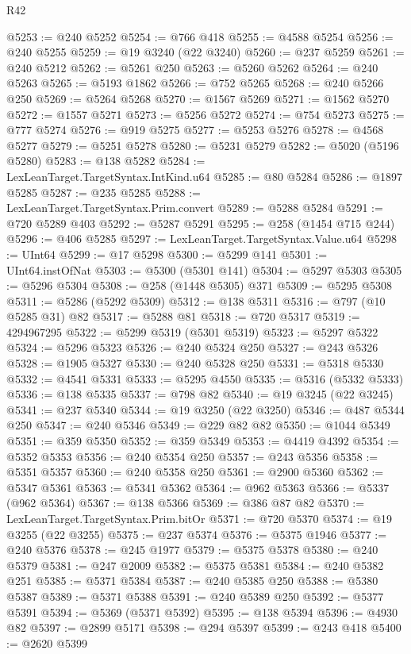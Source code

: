 \begin{lexlean}{R42}
\begin{coremodule}
{@5253 := @240 @5252
@5254 := @766 @418
@5255 := @4588 @5254
@5256 := @240 @5255
@5259 := @19 @3240 (@22 @3240)
@5260 := @237 @5259
@5261 := @240 @5212
@5262 := @5261 @250
@5263 := @5260 @5262
@5264 := @240 @5263
@5265 := @5193 @1862
@5266 := @752 @5265
@5268 := @240 @5266 @250
@5269 := @5264 @5268
@5270 := @1567 @5269
@5271 := @1562 @5270
@5272 := @1557 @5271
@5273 := @5256 @5272
@5274 := @754 @5273
@5275 := @777 @5274
@5276 := @919 @5275
@5277 := @5253 @5276
@5278 := @4568 @5277
@5279 := @5251 @5278
@5280 := @5231 @5279
@5282 := @5020 (@5196 @5280)
@5283 := @138 @5282
@5284 := LexLeanTarget.TargetSyntax.IntKind.u64
@5285 := @80 @5284
@5286 := @1897 @5285
@5287 := @235 @5285
@5288 := LexLeanTarget.TargetSyntax.Prim.convert
@5289 := @5288 @5284
@5291 := @720 @5289 @403
@5292 := @5287 @5291
@5295 := @258 (@1454 @715 @244)
@5296 := @406 @5285
@5297 := LexLeanTarget.TargetSyntax.Value.u64
@5298 := UInt64
@5299 := @17 @5298
@5300 := @5299 @141
@5301 := UInt64.instOfNat
@5303 := @5300 (@5301 @141)
@5304 := @5297 @5303
@5305 := @5296 @5304
@5308 := @258 (@1448 @5305) @371
@5309 := @5295 @5308
@5311 := @5286 (@5292 @5309)
@5312 := @138 @5311
@5316 := @797 (@10 @5285 @31) @82
@5317 := @5288 @81
@5318 := @720 @5317
@5319 := 4294967295
@5322 := @5299 @5319 (@5301 @5319)
@5323 := @5297 @5322
@5324 := @5296 @5323
@5326 := @240 @5324 @250
@5327 := @243 @5326
@5328 := @1905 @5327
@5330 := @240 @5328 @250
@5331 := @5318 @5330
@5332 := @4541 @5331
@5333 := @5295 @4550
@5335 := @5316 (@5332 @5333)
@5336 := @138 @5335
@5337 := @798 @82
@5340 := @19 @3245 (@22 @3245)
@5341 := @237 @5340
@5344 := @19 @3250 (@22 @3250)
@5346 := @487 @5344 @250
@5347 := @240 @5346
@5349 := @229 @82 @82
@5350 := @1044 @5349
@5351 := @359 @5350
@5352 := @359 @5349
@5353 := @4419 @4392
@5354 := @5352 @5353
@5356 := @240 @5354 @250
@5357 := @243 @5356
@5358 := @5351 @5357
@5360 := @240 @5358 @250
@5361 := @2900 @5360
@5362 := @5347 @5361
@5363 := @5341 @5362
@5364 := @962 @5363
@5366 := @5337 (@962 @5364)
@5367 := @138 @5366
@5369 := @386 @87 @82
@5370 := LexLeanTarget.TargetSyntax.Prim.bitOr
@5371 := @720 @5370
@5374 := @19 @3255 (@22 @3255)
@5375 := @237 @5374
@5376 := @5375 @1946
@5377 := @240 @5376
@5378 := @245 @1977
@5379 := @5375 @5378
@5380 := @240 @5379
@5381 := @247 @2009
@5382 := @5375 @5381
@5384 := @240 @5382 @251
@5385 := @5371 @5384
@5387 := @240 @5385 @250
@5388 := @5380 @5387
@5389 := @5371 @5388
@5391 := @240 @5389 @250
@5392 := @5377 @5391
@5394 := @5369 (@5371 @5392)
@5395 := @138 @5394
@5396 := @4930 @82
@5397 := @2899 @5171
@5398 := @294 @5397
@5399 := @243 @418
@5400 := @2620 @5399
}
\end{coremodule}
\end{lexlean}
